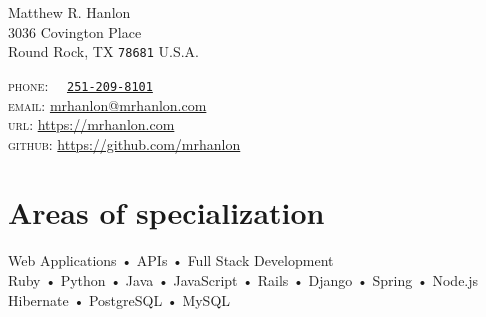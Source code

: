 \documentclass[10pt, a4paper]{article}
\begin{document}
{\LARGE Matthew R. Hanlon}\\[.3cm]
3036 Covington Place\\
Round Rock, TX \texttt{78681}
U.S.A.
\begin{tabbing}
\textsc{phone}:~~ \= \href{tel:251-209-8101}{\texttt{251-209-8101}}\\
\textsc{email}: \> \href{mailto:mrhanlon@mrhanlon.com}{mrhanlon@mrhanlon.com}\\
\textsc{url}: \> \href{https://mrhanlon.com}{https://mrhanlon.com}\\
\textsc{github}: \> \href{https://github.com/mrhanlon}{https://github.com/mrhanlon}
\end{tabbing}

\vfill{}

\section*{Areas of specialization}
Web Applications • APIs • Full Stack Development\\
Ruby • Python • Java • JavaScript • Rails • Django • Spring • Node.js\\
Hibernate • PostgreSQL • MySQL

\end{document}

